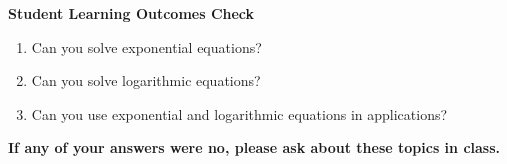 \documentclass[11pt]{article}
\begin{document}
\noindent \textbf{Student Learning Outcomes Check}

\begin{enumerate}
\item Can you solve exponential equations?
\item Can you solve logarithmic equations?
\item Can you use exponential and logarithmic equations in applications?
\end{enumerate}

\noindent \textbf{If any of your answers were no, please ask about these topics in class.}
\end{document}
